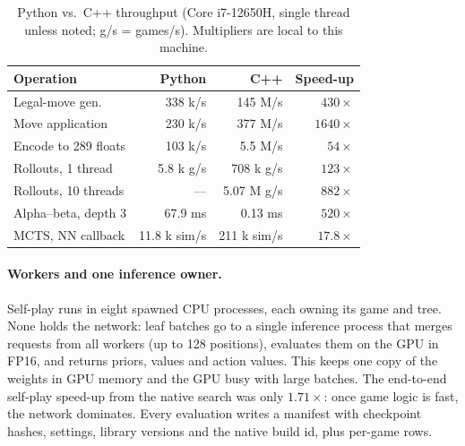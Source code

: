 \documentclass[conference]{IEEEtran}
\begin{document}
\begin{table}[t]
  \centering\footnotesize
  \setlength{\tabcolsep}{3pt}
  \caption{Python vs.\ C++ throughput (Core i7-12650H, single thread
  unless noted; g/s = games/s). Multipliers are local to this machine.}
  \label{tab:bench}
  \begin{tabular}{@{}lrrr@{}}
    \toprule
    Operation & Python & C++ & Speed-up \\
    \midrule
    Legal-move gen. & 338 k/s & 145 M/s & $430\times$ \\
    Move application & 230 k/s & 377 M/s & $1640\times$ \\
    Encode to 289 floats & 103 k/s & 5.5 M/s & $54\times$ \\
    Rollouts, 1 thread & 5.8 k g/s & 708 k g/s & $123\times$ \\
    Rollouts, 10 threads & --- & 5.07 M g/s & $882\times$ \\
    Alpha--beta, depth 3 & 67.9 ms & 0.13 ms & $520\times$ \\
    MCTS, NN callback & 11.8 k sim/s & 211 k sim/s & $17.8\times$ \\
    \bottomrule
  \end{tabular}
\end{table}

\paragraph{Workers and one inference owner.}
Self-play runs in eight spawned CPU processes, each owning its game and
tree. None holds the network: leaf batches go to a single inference
process that merges requests from all workers (up to 128 positions),
evaluates them on the GPU in FP16, and returns priors, values and action
values. This keeps one copy of the weights in GPU memory and the GPU busy
with large batches. The end-to-end self-play speed-up from the native
search was only $1.71\times$: once game logic is fast, the network
dominates. Every evaluation writes a manifest with checkpoint hashes,
settings, library versions and the native build id, plus per-game rows.
\end{document}
